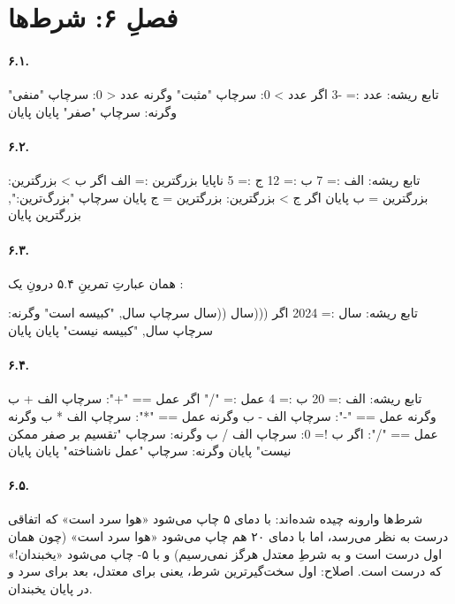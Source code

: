 \section*{فصلِ ۶: شرط‌ها}

\paragraph{۶.۱.}
\begin{salamfa}
تابع ریشه:
    عدد := -3
    اگر عدد > 0:
        سرچاپ "مثبت"
    وگرنه عدد < 0:
        سرچاپ "منفی"
    وگرنه:
        سرچاپ "صفر"
    پایان
پایان
\end{salamfa}

\paragraph{۶.۲.}
\begin{salamfa}
تابع ریشه:
    الف := 7
    ب := 12
    ج := 5
    ناپایا بزرگترین := الف
    اگر ب > بزرگترین:
        بزرگترین = ب
    پایان
    اگر ج > بزرگترین:
        بزرگترین = ج
    پایان
    سرچاپ "بزرگ‌ترین:", بزرگترین
پایان
\end{salamfa}

\paragraph{۶.۳.} همان عبارتِ تمرینِ ۵.۴ درونِ یک :
\begin{salamfa}
تابع ریشه:
    سال := 2024
    اگر (((سال %
        ((سال %
        سرچاپ سال, "کبیسه است"
    وگرنه:
        سرچاپ سال, "کبیسه نیست"
    پایان
پایان
\end{salamfa}

\paragraph{۶.۴.}
\begin{salamfa}
تابع ریشه:
    الف := 20
    ب := 4
    عمل := "/"
    اگر عمل == "+":
        سرچاپ الف + ب
    وگرنه عمل == "-":
        سرچاپ الف - ب
    وگرنه عمل == "*":
        سرچاپ الف * ب
    وگرنه عمل == "/":
        اگر ب != 0:
            سرچاپ الف / ب
        وگرنه:
            سرچاپ "تقسیم بر صفر ممکن نیست"
        پایان
    وگرنه:
        سرچاپ "عمل ناشناخته"
    پایان
پایان
\end{salamfa}

\paragraph{۶.۵.} شرط‌ها وارونه چیده شده‌اند: با دمای ۵ چاپ می‌شود «هوا
سرد است» که اتفاقی درست به نظر می‌رسد، اما با دمای ۲۰ هم چاپ می‌شود
«هوا سرد است» (چون  همان اول درست است و به شرطِ معتدل
هرگز نمی‌رسیم) و با ۵- چاپ می‌شود «یخبندان!» که درست است. اصلاح: اول
سخت‌گیرترین شرط، یعنی  برای معتدل، بعد 
برای سرد و در پایان یخبندان.

